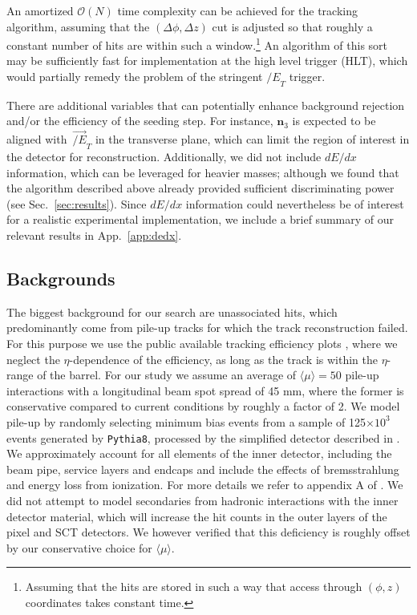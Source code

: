 \documentclass[10pt,aps,prd,nofootinbib,superscriptaddress,twocolumn,preprintnumbers,balancelastpage]{revtex4}
\newcommand{\MET}{{\slash\!\!\!\!E}_{T}}
\newcommand{\vMET}{{\vec{\slash\!\!\!\!E}_{T}}}
\begin{document}
An amortized $\mathcal{O}(N)$ time complexity can be achieved for the tracking algorithm, assuming that the $(\Delta \phi, \Delta z)$ cut is adjusted so that roughly a constant number of hits are within such a window.\footnote{Assuming that the hits are stored in such a way that access through $(\phi,z)$ coordinates takes constant time.}  An algorithm of this sort may be sufficiently fast for implementation at the high level trigger (HLT), which would partially remedy the problem of the stringent $\MET$ trigger.

There are additional variables that can potentially enhance background rejection and/or the efficiency of the seeding step. For instance, ${\bm n}_3$ is expected to be aligned with $\,\vMET$ in the transverse plane, which can limit the region of interest in the detector for reconstruction. Additionally, we did not include $dE/dx$ information, which can be leveraged for heavier masses; although we found that the algorithm described above already provided sufficient discriminating power (see Sec.~\ref{sec:results}). Since $dE/dx$ information could nevertheless be of interest for a realistic experimental implementation, we include a brief summary of our relevant results in App.~\ref{app:dedx}.

\subsection{Backgrounds}

The biggest background for our search are unassociated hits, which predominantly come from pile-up tracks for which the track reconstruction failed. For this purpose we use the public available tracking efficiency plots \cite{ATL-PHYS-PUB-2015-051}, where we neglect the $\eta$-dependence of the efficiency, as long as the track is within the $\eta$-range of the barrel. For our study we assume an average of $\langle \mu\rangle=50$ pile-up interactions with a longitudinal beam spot spread of 45 mm, where the former is conservative compared to current conditions by roughly a factor of 2. We model pile-up by randomly selecting minimum bias events from a sample of 125$\times 10^3$ events generated by \texttt{Pythia8}, processed by the simplified detector described in \cite{Knapen:2016hky}. %
We approximately account for all elements of the inner detector, including the beam pipe, service layers and endcaps and include the effects of bremsstrahlung and energy loss from ionization. For more details we refer to appendix A of \cite{Knapen:2016hky}. We did not attempt to model secondaries from hadronic interactions with the inner detector material, which will increase the hit counts in the outer layers of the pixel and SCT detectors. We however verified that this deficiency is roughly offset by our conservative choice for $\langle \mu\rangle$.
\end{document}
